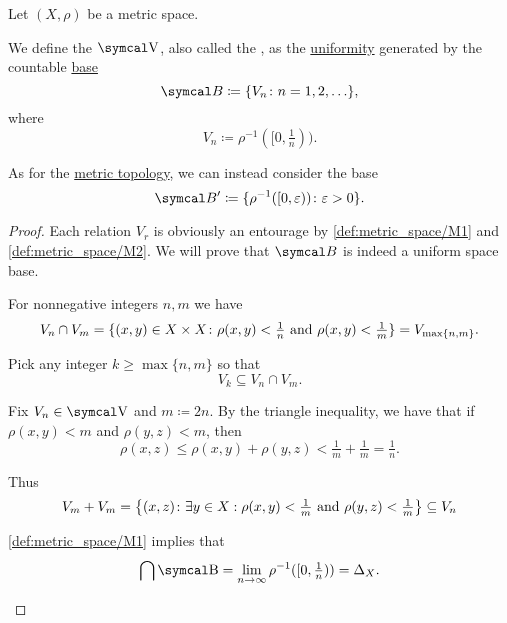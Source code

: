 \begin{definition}\label{def:metric_uniformity}
  Let \( (X, \rho) \) be a metric space.

  We define the  \( \CV \), also called the , as the \hyperref[def:uniform_space]{uniformity} generated by the countable \hyperref[thm:uniform_space_base_axioms]{base}
  \begin{equation}\label{def:metric_uniformity/integer_base}
    \Cal{B} \coloneqq \{ V_n \colon n = 1, 2, \ldots \},
  \end{equation}
  where
  \begin{equation*}
    V_n \coloneqq \rho^{-1}([0, \tfrac 1 n)).
  \end{equation*}

  As for the \hyperref[def:metric_topology]{metric topology}, we can instead consider the base
  \begin{equation}\label{def:metric_uniformity/real_base}
    \Cal{B}' \coloneqq \{ \rho^{-1}([0, \varepsilon)) \colon \varepsilon > 0 \}.
  \end{equation}
\end{definition}
\begin{proof}
  Each relation \( V_r \) is obviously an entourage by \ref{def:metric_space/M1} and \ref{def:metric_space/M2}. We will prove that \( \Cal{B} \) is indeed a uniform space base.

  \begin{RefList}
     For nonnegative integers \( n, m \) we have
    \begin{equation*}
      V_n \cap V_m
      =
      \{ (x, y) \in X \times X \colon \rho(x, y) < \tfrac 1 n \text{ and } \rho(x, y) < \tfrac 1 m \}
      =
      V_{\max\{ n, m \}}.
    \end{equation*}

    Pick any integer \( k \geq \max\{ n, m \} \) so that
    \begin{equation*}
      V_k \subseteq V_n \cap V_m.
    \end{equation*}

     Fix \( V_n \in \CV \) and \( m \coloneqq 2n \). By the triangle inequality, we have that if \( \rho(x, y) < m \) and \( \rho(y, z) < m \), then
    \begin{equation*}
      \rho(x, z) \leq \rho(x, y) + \rho(y, z) < \tfrac 1 m + \tfrac 1 m = \tfrac 1 n.
    \end{equation*}

    Thus
    \begin{equation*}
      V_m + V_m
      =
      \left\{ (x, z) \colon \exists y \in X: \rho(x, y) < \tfrac 1 m \text{ and } \rho(y, z) < \tfrac 1 m \right\}
      \subseteq
      V_n
    \end{equation*}

     \ref{def:metric_space/M1} implies that
    \begin{equation*}
      \bigcap \CB = \lim_{n \to \infty} \rho^{-1}([0, \tfrac 1 n)) = \Delta_X.
    \end{equation*}
  \end{RefList}
\end{proof}

